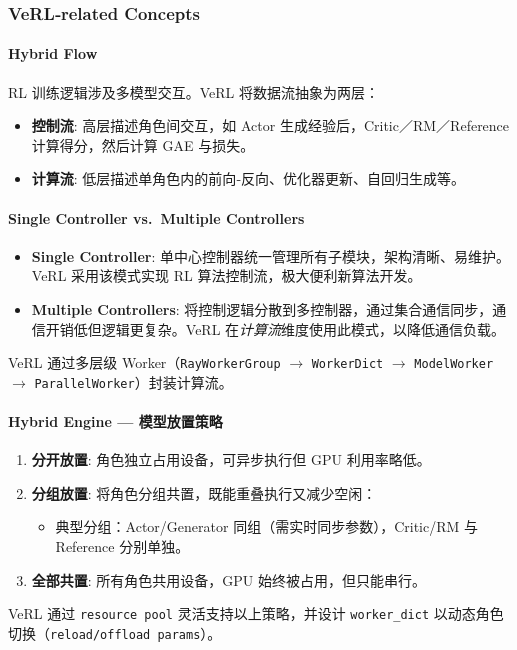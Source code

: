 \documentclass{pkuthesis}
\begin{document}
\subsubsection{VeRL‐related Concepts}

\paragraph{Hybrid Flow}
RL 训练逻辑涉及多模型交互。VeRL 将数据流抽象为两层：
\begin{itemize}
    \item \textbf{控制流}: 高层描述角色间交互，如 Actor 生成经验后，Critic／RM／Reference 计算得分，然后计算 GAE 与损失。
    \item \textbf{计算流}: 低层描述单角色内的前向‐反向、优化器更新、自回归生成等。
\end{itemize}

\paragraph{Single Controller vs.\ Multiple Controllers}
\begin{itemize}
    \item \textbf{Single Controller}: 单中心控制器统一管理所有子模块，架构清晰、易维护。VeRL 采用该模式实现 RL 算法控制流，极大便利新算法开发。
    \item \textbf{Multiple Controllers}: 将控制逻辑分散到多控制器，通过集合通信同步，通信开销低但逻辑更复杂。VeRL 在\emph{计算流}维度使用此模式，以降低通信负载。
\end{itemize}
VeRL 通过多层级 Worker（\texttt{RayWorkerGroup} $\rightarrow$ \texttt{WorkerDict} $\rightarrow$ \texttt{ModelWorker} $\rightarrow$ \texttt{ParallelWorker}）封装计算流。

\paragraph{Hybrid Engine — 模型放置策略}
\begin{enumerate}
    \item \textbf{分开放置}: 角色独立占用设备，可异步执行但 GPU 利用率略低。
    \item \textbf{分组放置}: 将角色分组共置，既能重叠执行又减少空闲：
    \begin{itemize}
        \item 典型分组：Actor/Generator 同组（需实时同步参数），Critic/RM 与 Reference 分别单独。
    \end{itemize}
    \item \textbf{全部共置}: 所有角色共用设备，GPU 始终被占用，但只能串行。
\end{enumerate}
VeRL 通过 \texttt{resource pool} 灵活支持以上策略，并设计 \texttt{worker\_dict} 以动态角色切换（\texttt{reload/offload params}）。
\end{document}
